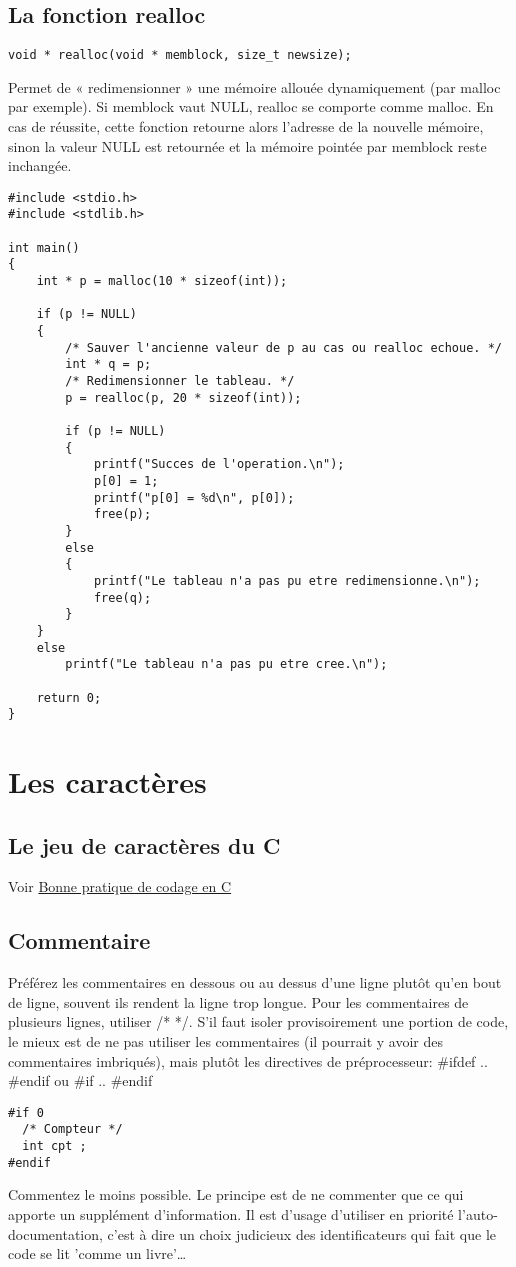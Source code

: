 \documentclass[a4paper]{article}
\begin{document}
\subsection{La fonction realloc}
\begin{lstlisting}
void * realloc(void * memblock, size_t newsize);
\end{lstlisting}
Permet de « redimensionner » une mémoire allouée dynamiquement (par malloc par exemple). Si memblock vaut NULL, realloc se comporte comme malloc. En cas de réussite, cette fonction retourne alors l'adresse de la nouvelle mémoire, sinon la valeur NULL est retournée et la mémoire pointée par memblock reste inchangée.
\begin{lstlisting}
#include <stdio.h>
#include <stdlib.h>

int main()
{
    int * p = malloc(10 * sizeof(int));

    if (p != NULL)
    {
        /* Sauver l'ancienne valeur de p au cas ou realloc echoue. */
        int * q = p;
        /* Redimensionner le tableau. */
        p = realloc(p, 20 * sizeof(int));

        if (p != NULL)
        {
            printf("Succes de l'operation.\n");
            p[0] = 1;
            printf("p[0] = %d\n", p[0]);
            free(p);
        }
        else
        {
            printf("Le tableau n'a pas pu etre redimensionne.\n");
            free(q);
        }
    }
    else
        printf("Le tableau n'a pas pu etre cree.\n");

    return 0;
}
\end{lstlisting}
\section{Les caractères}
\subsection{Le jeu de caractères du C}
Voir \href{http://emmanuel-delahaye.developpez.com/tutoriels/c/bonnes-pratiques-codage-c/#LI-A}{Bonne pratique de codage en C}
\subsection{Commentaire}
Préférez les commentaires en dessous ou au dessus d'une ligne plutôt qu'en bout de ligne, souvent ils rendent la ligne trop longue. \newline
Pour les commentaires de plusieurs lignes, utiliser /* */.\newline
S'il faut isoler provisoirement une portion de code, le mieux est de ne pas utiliser les commentaires (il pourrait y avoir des commentaires imbriqués), mais plutôt les directives de préprocesseur: \#ifdef .. \#endif ou \#if .. \#endif
\begin{lstlisting}
#if 0
  /* Compteur */
  int cpt ;
#endif
\end{lstlisting}
Commentez le moins possible. Le principe est de ne commenter que ce qui apporte un supplément d'information. Il est d'usage d'utiliser en priorité l'auto-documentation, c'est à dire un choix judicieux des identificateurs qui fait que le code se lit 'comme un livre'…
\end{document}
